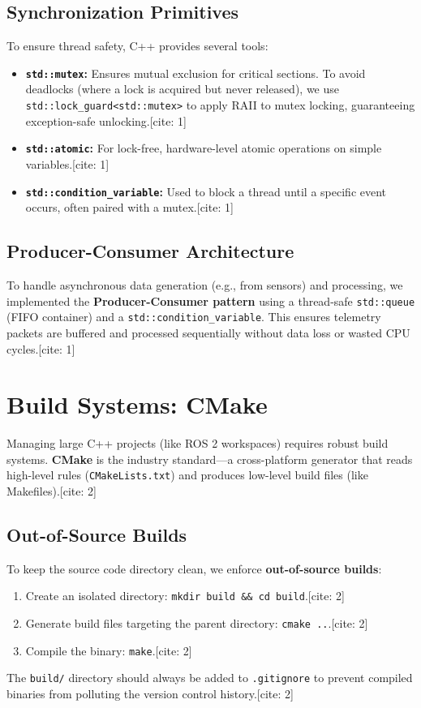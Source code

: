 \documentclass{article}
\begin{document}
\subsection*{Synchronization Primitives}
To ensure thread safety, C++ provides several tools:
\begin{itemize}
    \item \textbf{\texttt{std::mutex}:} Ensures mutual exclusion for critical sections. To avoid deadlocks (where a lock is acquired but never released), we use \texttt{std::lock\_guard<std::mutex>} to apply RAII to mutex locking, guaranteeing exception-safe unlocking.[cite: 1]
    \item \textbf{\texttt{std::atomic}:} For lock-free, hardware-level atomic operations on simple variables.[cite: 1]
    \item \textbf{\texttt{std::condition\_variable}:} Used to block a thread until a specific event occurs, often paired with a mutex.[cite: 1]
\end{itemize}

\subsection*{Producer-Consumer Architecture}
To handle asynchronous data generation (e.g., from sensors) and processing, we implemented the \textbf{Producer-Consumer pattern} using a thread-safe \texttt{std::queue} (FIFO container) and a \texttt{std::condition\_variable}. This ensures telemetry packets are buffered and processed sequentially without data loss or wasted CPU cycles.[cite: 1]

\section{Build Systems: CMake}
Managing large C++ projects (like ROS 2 workspaces) requires robust build systems. \textbf{CMake} is the industry standard—a cross-platform generator that reads high-level rules (\texttt{CMakeLists.txt}) and produces low-level build files (like Makefiles).[cite: 2]

\subsection*{Out-of-Source Builds}
To keep the source code directory clean, we enforce \textbf{out-of-source builds}:
\begin{enumerate}
    \item Create an isolated directory: \texttt{mkdir build \&\& cd build}.[cite: 2]
    \item Generate build files targeting the parent directory: \texttt{cmake ..}.[cite: 2]
    \item Compile the binary: \texttt{make}.[cite: 2]
\end{enumerate}
The \texttt{build/} directory should always be added to \texttt{.gitignore} to prevent compiled binaries from polluting the version control history.[cite: 2]
\end{document}
